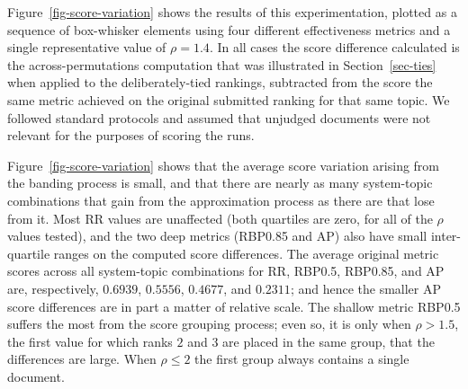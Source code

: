 \documentclass[runningheads,a4paper]{llncs}
\begin{document}
Figure~\ref{fig-score-variation} shows the results of this
experimentation, plotted as a sequence of box-whisker elements using
four different effectiveness metrics and a single representative
value of $\rho=1.4$.
In all cases the score difference calculated is the
across-permutations computation that was illustrated in
Section~\ref{sec-ties} when applied to the deliberately-tied
rankings, subtracted from the score the same metric achieved on the
original submitted ranking for that same topic.
We followed standard protocols and assumed that unjudged documents
were not relevant for the purposes of scoring the runs.

Figure~\ref{fig-score-variation} shows that the average score
variation arising from the banding process is small, and that there
are nearly as many system-topic combinations that gain from the
approximation process as there are that lose from it.
Most RR values are unaffected (both quartiles are zero, for all of
the $\rho$ values tested), and the two deep metrics (RBP0.85 and
AP) also have small inter-quartile ranges on the computed score
differences.
The average original metric scores across all system-topic
combinations for RR, RBP0.5, RBP0.85, and AP are, respectively,
$0.6939$, $0.5556$, $0.4677$, and $0.2311$; and hence the
smaller AP score differences are in part a matter of relative scale.
The shallow metric RBP0.5 suffers the most from the score grouping
process; even so, it is only when $\rho>1.5$, the first value for
which ranks $2$ and $3$ are placed in the same group, that the
differences are large.
When  $\rho\le2$ the first group always contains a
single document.
\end{document}
